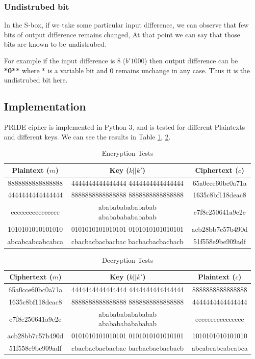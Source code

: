 \documentclass{transcrypto}
\begin{document}
	\subsubsection{Undistrubed bit}
	In the S-box, if we take some particular input difference, we can observe that few bits of output difference remains changed, At that point we can say that those bits are known to be undistrubed.
	
	For example if the input difference is 8 ($b'1000$) then output difference can be \textbf{*0**} where * is a variable bit and 0 remains unchange in any case. Thus it is the undistrubed bit here.
	
	\subsection{Implementation}
	PRIDE cipher is implemented in Python 3, and is tested for different Plaintexts and different keys. We can see the results in Table \ref{e}, \ref{d}.
	\begin{table}[H]
		\centering
		\begin{tabular}{|c|c|c|}
			\hline
			\textbf{Plaintext} ($m$) & \textbf{Key} ($k||k'$) & \textbf{Ciphertext} ($c$) \\ \hline
			8888888888888888 & 4444444444444444   4444444444444444 & 65a0cce60bc0a71a \\ \hline
			4444444444444444 & 8888888888888888   8888888888888888 & 1635c8bf118deac8 \\ \hline
			eeeeeeeeeeeeeeee & abababababababab   abababababababab & e7f8e250641a9c2e \\ \hline
			1010101010101010 & 0101010101010101   0101010101010101 & acb28bb7c57b490d \\ \hline
			abcabcabcabcabca & cbacbacbacbacbac   bacbacbacbacbacb & 51f558e9be909adf \\ \hline
		\end{tabular}
		\caption{Encryption Tests}
		\label{e}
	\end{table}
	\begin{table}[H]
		\centering
		\begin{tabular}{|c|c|c|}
			\hline
			\textbf{Ciphertext} ($m$) & \textbf{Key} ($k||k'$) & \textbf{Plaintext} ($c$) \\ \hline
			65a0cce60bc0a71a & 4444444444444444   4444444444444444  & 8888888888888888\\ \hline
			1635c8bf118deac8 & 8888888888888888   8888888888888888  & 4444444444444444\\ \hline
			e7f8e250641a9c2e & abababababababab   abababababababab  & eeeeeeeeeeeeeeee\\ \hline
			acb28bb7c57b490d & 0101010101010101   0101010101010101  & 1010101010101010\\ \hline
			51f558e9be909adf & cbacbacbacbacbac   bacbacbacbacbacb  & abcabcabcabcabca\\ \hline
		\end{tabular}
		\caption{Decryption Tests}
		\label{d}
	\end{table}
\end{document}
